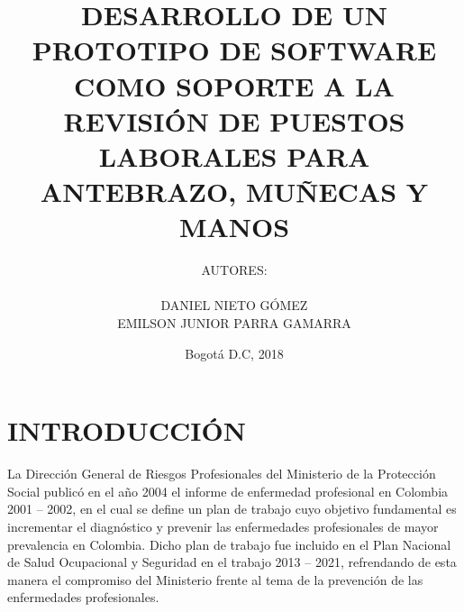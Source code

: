 


\usepackage{lipsum}
\usepackage[utf8]{inputenc}
\usepackage[spanish]{babel}
\usepackage{newunicodechar}
\title{DESARROLLO DE UN PROTOTIPO DE SOFTWARE COMO SOPORTE A LA REVISIÓN DE PUESTOS LABORALES PARA ANTEBRAZO, MUÑECAS Y MANOS}
\author{AUTORES:\\\vspace{1cm}\\DANIEL NIETO GÓMEZ\\EMILSON JUNIOR PARRA GAMARRA}

\date{Bogotá D.C, 2018}





	\onehalfspace
	\maketitle
	\tableofcontents
	\newpage \listoffigures
	\newpage \listoftables

	\setlength{\parskip}{\baselineskip} 
	\newpage
	
	
\chapter{INTRODUCCIÓN} 
La Dirección General de Riesgos Profesionales del Ministerio de la Protección Social publicó en el año 2004 el informe de enfermedad profesional en Colombia 2001 – 2002, en el cual se define un plan de trabajo cuyo objetivo fundamental es incrementar el diagnóstico y prevenir las enfermedades profesionales de mayor prevalencia en Colombia. Dicho plan de trabajo fue incluido en el Plan Nacional de Salud Ocupacional y Seguridad en el trabajo 2013 – 2021, refrendando de esta manera el compromiso del Ministerio frente al tema de la prevención de las enfermedades profesionales.

